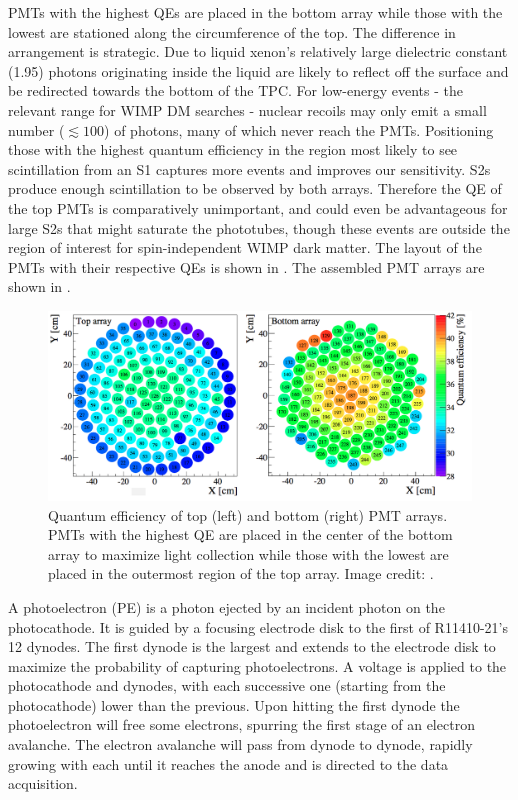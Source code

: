 PMTs with the highest QEs are placed in the bottom array while those with the lowest are stationed along the circumference of the
top.  The difference in arrangement is strategic.  Due to liquid xenon's relatively large dielectric constant (1.95) photons
originating inside the liquid are likely to
reflect off the surface and be redirected towards the bottom of the TPC.  For low-energy events - the relevant range for WIMP DM
searches - nuclear recoils may only emit a small number ($\lesssim 100$) of photons, many of which never reach the PMTs.  Positioning
those with the highest quantum efficiency in the region most likely to see scintillation from an S1 captures more events and improves our
sensitivity.  S2s produce enough scintillation to be observed by both arrays.  Therefore the QE of the top PMTs is comparatively
unimportant, and could even be advantageous for large S2s that might saturate the phototubes, though these events are outside the region
of interest for spin-independent WIMP dark matter.  The layout of the PMTs with their respective QEs is shown
in .  The assembled PMT arrays are shown in .

\begin{figure}
\centering
\includegraphics[width=\textwidth]{PMTQuantumEfficiency}
\caption{Quantum efficiency of top (left) and bottom (right) PMT arrays.  PMTs with the highest QE are placed in the center of the bottom
array to maximize light collection while those with the lowest are placed in the outermost region of the top array.  Image credit:
.}
\label{fig:xenon1t_pmt_qe}
\end{figure}

A photoelectron (PE) is a photon ejected by an incident photon on the photocathode.  It is guided by a focusing electrode disk to the
first of R11410-21's 12 dynodes.  The first dynode is the largest and extends to the electrode disk
to maximize the probability of capturing photoelectrons.  A voltage is applied to the photocathode and dynodes,
with each successive one (starting from the photocathode) lower than the previous.  Upon hitting the first dynode the photoelectron will
free some electrons, spurring the first stage of an electron avalanche.  The electron avalanche will pass from dynode to dynode, rapidly
growing with each until it reaches the anode and is directed to the data acquisition.

